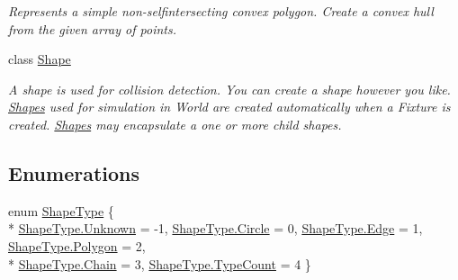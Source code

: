 \begin{DoxyCompactItemize}
\begin{DoxyCompactList}\small\item\em Represents a simple non-\/selfintersecting convex polygon. Create a convex hull from the given array of points. \end{DoxyCompactList}\item 
class \hyperlink{class_farseer_physics_1_1_collision_1_1_shapes_1_1_shape}{Shape}
\begin{DoxyCompactList}\small\item\em A shape is used for collision detection. You can create a shape however you like. \hyperlink{namespace_farseer_physics_1_1_collision_1_1_shapes}{Shapes} used for simulation in World are created automatically when a Fixture is created. \hyperlink{namespace_farseer_physics_1_1_collision_1_1_shapes}{Shapes} may encapsulate a one or more child shapes. \end{DoxyCompactList}\end{DoxyCompactItemize}
\subsection*{Enumerations}
\begin{DoxyCompactItemize}
\item 
enum \hyperlink{namespace_farseer_physics_1_1_collision_1_1_shapes_a54e12281f639907006495f4af9f45d5e}{Shape\+Type} \{ \\*
\hyperlink{namespace_farseer_physics_1_1_collision_1_1_shapes_a54e12281f639907006495f4af9f45d5ea88183b946cc5f0e8c96b2e66e1c74a7e}{Shape\+Type.\+Unknown} = -\/1, 
\hyperlink{namespace_farseer_physics_1_1_collision_1_1_shapes_a54e12281f639907006495f4af9f45d5ea30954d90085f6eaaf5817917fc5fecb3}{Shape\+Type.\+Circle} = 0, 
\hyperlink{namespace_farseer_physics_1_1_collision_1_1_shapes_a54e12281f639907006495f4af9f45d5eae4a297a0f76119a442c2595ac040673e}{Shape\+Type.\+Edge} = 1, 
\hyperlink{namespace_farseer_physics_1_1_collision_1_1_shapes_a54e12281f639907006495f4af9f45d5ea4c0a11247d92f73fb84baa51e37a3263}{Shape\+Type.\+Polygon} = 2, 
\\*
\hyperlink{namespace_farseer_physics_1_1_collision_1_1_shapes_a54e12281f639907006495f4af9f45d5ea5320550175ad6f79ad658943b9c013a7}{Shape\+Type.\+Chain} = 3, 
\hyperlink{namespace_farseer_physics_1_1_collision_1_1_shapes_a54e12281f639907006495f4af9f45d5ea834c072a52bcf98866ed2eadaaa861a1}{Shape\+Type.\+Type\+Count} = 4
 \}
\end{DoxyCompactItemize}



